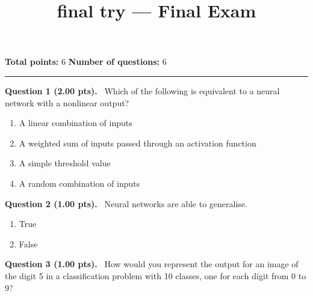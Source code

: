 \documentclass[12pt,a4paper]{article}
\title{final try — Final Exam}
\date{}
\begin{document}
\maketitle



\noindent
\textbf{Total points:} 6
\hfill
\textbf{Number of questions:} 6

\vspace{1em}
\hrule
\vspace{1.5em}


\noindent
\textbf{Question 1 (2.00 pts).}~
Which of the following is equivalent to a neural network with a nonlinear output?


\begin{enumerate}[label=\textbf{\Alph*.}]

  \item A linear combination of inputs

  \item A weighted sum of inputs passed through an activation function

  \item A simple threshold value

  \item A random combination of inputs

\end{enumerate}



\vspace{0.5em}


\noindent
\textbf{Question 2 (1.00 pts).}~
Neural networks are able to generalise.


\begin{enumerate}[label=\textbf{\Alph*.}]
  \item True
  \item False
\end{enumerate}



\vspace{0.5em}


\noindent
\textbf{Question 3 (1.00 pts).}~
How would you represent the output for an image of the digit 5 in a classification problem with 10 classes, one for each digit from 0 to 9?


\vspace{0.4cm}
\noindent\makebox[\linewidth]{\hrulefill}
\vspace{0.6cm}



\vspace{0.5em}
\end{document}
